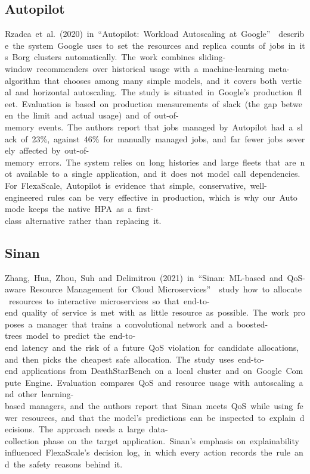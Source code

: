 \documentclass[12pt,a4paper,oneside]{report}
\begin{document}
\subsection{Autopilot}

Rzadca~et~al.~(2020)~in~``Autopilot:~Workload~Autoscaling~at~Google''~\cite{autopilot}~describe~the~system~Google~uses~to~set~the~resources~and~replica~counts~of~jobs~in~its~Borg~clusters~automatically.~The~work~combines~sliding-window~recommenders~over~historical~usage~with~a~machine-learning~meta-algorithm~that~chooses~among~many~simple~models,~and~it~covers~both~vertical~and~horizontal~autoscaling.~The~study~is~situated~in~Google's~production~fleet.~Evaluation~is~based~on~production~measurements~of~slack~(the~gap~between~the~limit~and~actual~usage)~and~of~out-of-memory~events.~The~authors~report~that~jobs~managed~by~Autopilot~had~a~slack~of~23\%,~against~46\%~for~manually~managed~jobs,~and~far~fewer~jobs~severely~affected~by~out-of-memory~errors.~The~system~relies~on~long~histories~and~large~fleets~that~are~not~available~to~a~single~application,~and~it~does~not~model~call~dependencies.~For~FlexaScale,~Autopilot~is~evidence~that~simple,~conservative,~well-engineered~rules~can~be~very~effective~in~production,~which~is~why~our~Auto~mode~keeps~the~native~HPA~as~a~first-class~alternative~rather~than~replacing~it.


\clearpage

\subsection{Sinan}

Zhang,~Hua,~Zhou,~Suh~and~Delimitrou~(2021)~in~``Sinan:~ML-based~and~QoS-aware~Resource~Management~for~Cloud~Microservices''~\cite{sinan}~study~how~to~allocate~resources~to~interactive~microservices~so~that~end-to-end~quality~of~service~is~met~with~as~little~resource~as~possible.~The~work~proposes~a~manager~that~trains~a~convolutional~network~and~a~boosted-trees~model~to~predict~the~end-to-end~latency~and~the~risk~of~a~future~QoS~violation~for~candidate~allocations,~and~then~picks~the~cheapest~safe~allocation.~The~study~uses~end-to-end~applications~from~DeathStarBench~on~a~local~cluster~and~on~Google~Compute~Engine.~Evaluation~compares~QoS~and~resource~usage~with~autoscaling~and~other~learning-based~managers,~and~the~authors~report~that~Sinan~meets~QoS~while~using~fewer~resources,~and~that~the~model's~predictions~can~be~inspected~to~explain~decisions.~The~approach~needs~a~large~data-collection~phase~on~the~target~application.~Sinan's~emphasis~on~explainability~influenced~FlexaScale's~decision~log,~in~which~every~action~records~the~rule~and~the~safety~reasons~behind~it.
\end{document}
